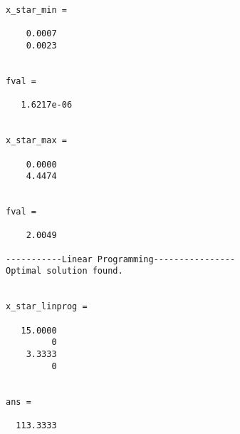\documentclass[11pt]{article}
\begin{document}
\begin{lstlisting}[caption={Output},label={lst:op}]
x_star_min =

    0.0007
    0.0023


fval =

   1.6217e-06


x_star_max =

    0.0000
    4.4474


fval =

    2.0049

-----------Linear Programming----------------
Optimal solution found.


x_star_linprog =

   15.0000
         0
    3.3333
         0


ans =

  113.3333
\end{lstlisting}
\end{document}
